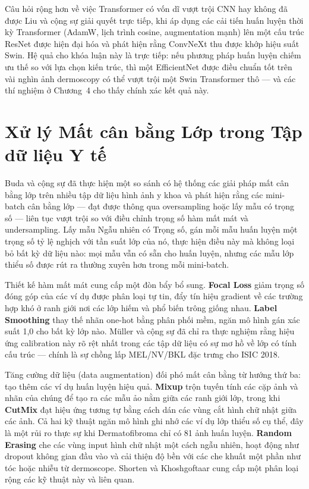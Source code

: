 Câu hỏi rộng hơn về việc Transformer có vốn dĩ vượt trội CNN hay không đã được Liu và cộng sự giải quyết trực tiếp, khi áp dụng các cải tiến huấn luyện thời kỳ Transformer (AdamW, lịch trình cosine, augmentation mạnh) lên một cấu trúc ResNet được hiện đại hóa và phát hiện rằng ConvNeXt thu được khớp hiệu suất Swin. Hệ quả cho khóa luận này là trực tiếp: nếu phương pháp huấn luyện chiếm ưu thế so với lựa chọn kiến trúc, thì một EfficientNet được điều chuẩn tốt trên vài nghìn ảnh dermoscopy có thể vượt trội một Swin Transformer thô --- và các thí nghiệm ở Chương~4 cho thấy chính xác kết quả này.

\section{Xử lý Mất cân bằng Lớp trong Tập dữ liệu Y tế}

Buda và cộng sự đã thực hiện một so sánh có hệ thống các giải pháp mất cân bằng lớp trên nhiều tập dữ liệu hình ảnh y khoa và phát hiện rằng các mini-batch cân bằng lớp --- đạt được thông qua oversampling hoặc lấy mẫu có trọng số --- liên tục vượt trội so với điều chỉnh trọng số hàm mất mát và undersampling. Lấy mẫu Ngẫu nhiên có Trọng số, gán mỗi mẫu huấn luyện một trọng số tỷ lệ nghịch với tần suất lớp của nó, thực hiện điều này mà không loại bỏ bất kỳ dữ liệu nào: mọi mẫu vẫn có sẵn cho huấn luyện, nhưng các mẫu lớp thiểu số được rút ra thường xuyên hơn trong mỗi mini-batch.

Thiết kế hàm mất mát cung cấp một đòn bẩy bổ sung. \textbf{Focal Loss} giảm trọng số đóng góp của các ví dụ được phân loại tự tin, đẩy tín hiệu gradient về các trường hợp khó ở ranh giới nơi các lớp hiếm và phổ biến trông giống nhau. \textbf{Label Smoothing} thay thế nhãn one-hot bằng phân phối mềm, ngăn mô hình gán xác suất 1,0 cho bất kỳ lớp nào. Müller và cộng sự đã chỉ ra thực nghiệm rằng hiệu ứng calibration này rõ rệt nhất trong các tập dữ liệu có sự mơ hồ về lớp có tính cấu trúc --- chính là sự chồng lấp MEL/NV/BKL đặc trưng cho ISIC 2018.

Tăng cường dữ liệu (data augmentation) đối phó mất cân bằng từ hướng thứ ba: tạo thêm các ví dụ huấn luyện hiệu quả. \textbf{Mixup} trộn tuyến tính các cặp ảnh và nhãn của chúng để tạo ra các mẫu ảo nằm giữa các ranh giới lớp, trong khi \textbf{CutMix} đạt hiệu ứng tương tự bằng cách dán các vùng cắt hình chữ nhật giữa các ảnh. Cả hai kỹ thuật ngăn mô hình ghi nhớ các ví dụ lớp thiểu số cụ thể, đây là một rủi ro thực sự khi Dermatofibroma chỉ có 81 ảnh huấn luyện. \textbf{Random Erasing} che các vùng input hình chữ nhật một cách ngẫu nhiên, hoạt động như dropout không gian đầu vào và cải thiện độ bền với các che khuất một phần như tóc hoặc nhiễu từ dermoscope. Shorten và Khoshgoftaar cung cấp một phân loại rộng các kỹ thuật này và liên quan.

